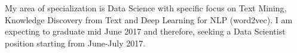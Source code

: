 
My area of specialization is Data Science with specific focus 
on Text Mining, Knowledge Discovery from Text and Deep Learning for NLP (word2vec).
I am expecting to graduate mid June 2017 and therefore, seeking a Data Scientist position 
starting from June-July 2017. 
